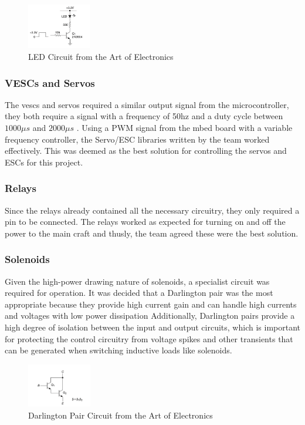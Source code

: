 \documentclass [12pt]{article}
\begin{document}
\begin{figure}[h]
    \centering
    \includegraphics[width=0.25\textwidth]{LED.png}
    \caption{LED Circuit from the Art of Electronics}
    \label{fig:LED}
\end{figure}

\subsubsection{VESCs and Servos}
The \gls{vesc}s and servos required a similar output signal from the microcontroller, they both require a signal with a frequency of 50hz and a duty cycle between $ 1000\mu s $ and $2000\mu s $ \cite{pinckney2006pulse}. Using a PWM signal from the mbed board with a variable frequency controller, the Servo/ESC libraries written by the team worked effectively. This was deemed as the best solution for controlling the servos and ESCs for this project.

\subsubsection{Relays}

Since the relays already contained all the necessary circuitry, they only required a pin to be connected. The relays worked as expected for turning on and off the power to the main craft and thusly, the team agreed these were the best solution.

\subsubsection{Solenoids}\label{sec:sols}

Given the high-power drawing nature of solenoids, a specialist circuit was required for operation. It was decided that a Darlington pair was the most appropriate because they provide high current gain and can handle high currents and voltages with low power dissipation Additionally, Darlington pairs provide a high degree of isolation between the input and output circuits, which is important for protecting the control circuitry from voltage spikes and other transients that can be generated when switching inductive loads like solenoids.

\begin{figure}[h]
    \centering
    \includegraphics[width=0.25\textwidth]{dpair.png}
    \caption{Darlington Pair Circuit from the Art of Electronics}
    \label{fig:dpair}
\end{figure}
\end{document}

